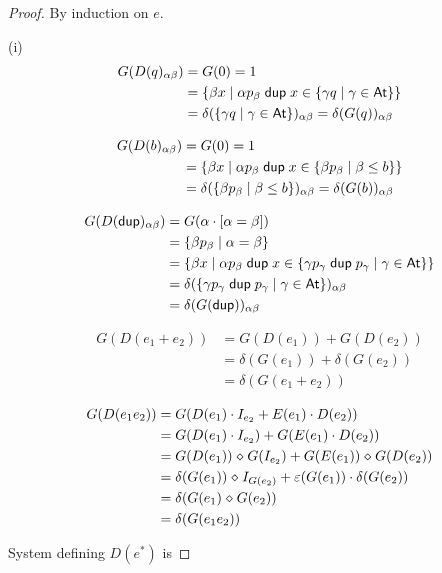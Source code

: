 \documentclass{article}
\newcommand\At{\ensuremath{\mathsf{At}}}
\renewcommand\smash{\mathrel{\diamond}}
\newcommand\bval[1]{[#1]}
\renewcommand\star{^*}
\newcommand{\kw}[1]{\ensuremath{\mathsf{#1}}}
\newcommand{\pdup}{\ensuremath{\mathrel{\kw{dup}}}}
\begin{document}
\begin{proof}
By induction on $e$.

(i)
\begin{align*}
G(D(q)_{\alpha\beta})
&= G(0)
= 1\\
&= \set{\beta x}{\alpha p_\beta\pdup x\in\set{\gamma q}{\gamma\in\At}}\\
&= \delta(\set{\gamma q}{\gamma\in\At})_{\alpha\beta}
= \delta(G(q))_{\alpha\beta}
\end{align*}

\begin{align*}
G(D(b)_{\alpha\beta})
&= G(0)
= 1\\
&= \set{\beta x}{\alpha p_\beta\pdup x\in\set{\beta p_\beta}{\beta\leq b}}\\
&= \delta(\set{\beta p_\beta}{\beta\leq b})_{\alpha\beta}
= \delta(G(b))_{\alpha\beta}
\end{align*}

\begin{align*}
G(D(\pdup)_{\alpha\beta})
&= G(\alpha\cdot\bval{\alpha=\beta})\\
&= \set{\beta p_\beta}{\alpha=\beta}\\
&= \set{\beta x}{\alpha p_\beta\pdup x\in\set{\gamma p_\gamma\pdup p_\gamma}{\gamma\in\At}}\\
&= \delta(\set{\gamma p_\gamma\pdup p_\gamma}{\gamma\in\At})_{\alpha\beta}\\
&= \delta(G(\pdup))_{\alpha\beta}
\end{align*}

\begin{align*}
G(D(e_1+e_2))
&= G(D(e_1)) + G(D(e_2))\\
&= \delta(G(e_1)) + \delta(G(e_2))\\
&= \delta(G(e_1 + e_2))
\end{align*}

\begin{align*}
G(D(e_1e_2))
&= G(D(e_1)\cdot I_{e_2} + E(e_1)\cdot D(e_2))\\
&= G(D(e_1)\cdot I_{e_2}) + G(E(e_1)\cdot D(e_2))\\
&= G(D(e_1))\smash G(I_{e_2}) + G(E(e_1))\smash G(D(e_2))\\
&= \delta(G(e_1))\smash I_{G(e_2)} + \eps(G(e_1))\cdot\delta(G(e_2))\\
&= \delta(G(e_1)\smash G(e_2))\\
&= \delta(G(e_1e_2))
\end{align*}

System defining $D(e\star)$ is


\end{proof}
\end{document}
